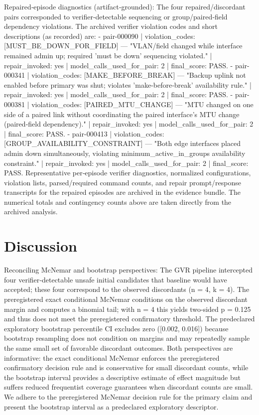 \documentclass[conference]{IEEEtran}
\begin{document}
Repaired‑episode diagnostics (artifact‑grounded): The four repaired/discordant pairs corresponded to verifier‑detectable sequencing or group/paired‑field dependency violations. The archived verifier violation codes and short descriptions (as recorded) are:
- pair-000090 | violation\_codes: [MUST\_BE\_DOWN\_FOR\_FIELD] --- "VLAN/field changed while interface remained admin up; required 'must be down' sequencing violated." | repair\_invoked: yes | model\_calls\_used\_for\_pair: 2 | final\_score: PASS.
- pair-000341 | violation\_codes: [MAKE\_BEFORE\_BREAK] --- "Backup uplink not enabled before primary was shut; violates 'make‑before‑break' availability rule." | repair\_invoked: yes | model\_calls\_used\_for\_pair: 2 | final\_score: PASS.
- pair-000381 | violation\_codes: [PAIRED\_MTU\_CHANGE] --- "MTU changed on one side of a paired link without coordinating the paired interface's MTU change (paired‑field dependency)." | repair\_invoked: yes | model\_calls\_used\_for\_pair: 2 | final\_score: PASS.
- pair-000413 | violation\_codes: [GROUP\_AVAILABILITY\_CONSTRAINT] --- "Both edge interfaces placed admin down simultaneously, violating minimum\_active\_in\_groups availability constraint." | repair\_invoked: yes | model\_calls\_used\_for\_pair: 2 | final\_score: PASS.
Representative per‑episode verifier diagnostics, normalized configurations, violation lists, parsed/required command counts, and repair prompt/response transcripts for the repaired episodes are archived in the evidence bundle. The numerical totals and contingency counts above are taken directly from the archived analysis.

\section{Discussion}
Reconciling McNemar and bootstrap perspectives: The GVR pipeline intercepted four verifier‑detectable unsafe initial candidates that baseline would have accepted; these four correspond to the observed discordants (n = 4, k = 4). The preregistered exact conditional McNemar conditions on the observed discordant margin and computes a binomial tail; with n = 4 this yields two‑sided p = 0.125 and thus does not meet the preregistered confirmatory threshold. The predeclared exploratory bootstrap percentile CI excludes zero ([0.002, 0.016]) because bootstrap resampling does not condition on margins and may repeatedly sample the same small set of favorable discordant outcomes. Both perspectives are informative: the exact conditional McNemar enforces the preregistered confirmatory decision rule and is conservative for small discordant counts, while the bootstrap interval provides a descriptive estimate of effect magnitude but suffers reduced frequentist coverage guarantees when discordant counts are small. We adhere to the preregistered McNemar decision rule for the primary claim and present the bootstrap interval as a predeclared exploratory descriptor.
\end{document}
